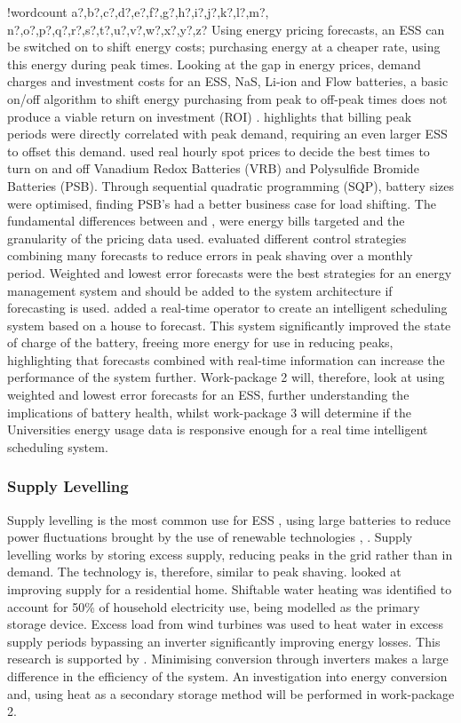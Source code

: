 \documentclass[fontsize=9.5pt]{extarticle}
\numberwithin{figure}{section} %
\newcounter{words}
\newenvironment{counted}{%
  \setcounter{words}{0}
  \SearchList!{wordcount}{\stepcounter{words}}
    {a?,b?,c?,d?,e?,f?,g?,h?,i?,j?,k?,l?,m?,
    n?,o?,p?,q?,r?,s?,t?,u?,v?,w?,x?,y?,z?}
  \UndoBoundary{'}
  \SearchOrder{p;}}{%
  \StopSearching}
\begin{document}
\begin{counted}
Using energy pricing forecasts, an ESS can be switched on to shift
energy costs; purchasing energy at a cheaper rate, using this energy
during peak times. Looking at the gap in energy prices, demand charges
and investment costs for an ESS, NaS, Li-ion and Flow batteries, a basic
on/off algorithm to shift energy purchasing from peak to off-peak times
does not produce a viable return on investment (ROI) \cite{7555795}.
\cite{7555793} highlights that billing peak periods were directly
correlated with peak demand, requiring an even larger ESS to offset this
demand. \cite{5590194} used real hourly spot prices to decide the best
times to turn on and off Vanadium Redox Batteries (VRB) and Polysulfide
Bromide Batteries (PSB). Through sequential quadratic programming (SQP),
battery sizes were optimised, finding PSB's had a better business case
for load shifting. The fundamental differences between \cite{7555795}
and \cite{5590194}, were energy bills targeted and the granularity of
the pricing data used. \cite{6938948} evaluated different control
strategies combining many forecasts to reduce errors in peak shaving
over a monthly period. Weighted and lowest error forecasts were the best
strategies for an energy management system and should be added to the
system architecture if forecasting is used. \cite{Bennett2015122} added
a real-time operator to create an intelligent scheduling system based on
a house to forecast. This system significantly improved the state of
charge of the battery, freeing more energy for use in reducing peaks,
highlighting that forecasts combined with real-time information can
increase the performance of the system further. Work-package 2 will,
therefore, look at using weighted and lowest error forecasts for an ESS,
further understanding the implications of battery health, whilst
work-package 3 will determine if the Universities energy usage data is
responsive enough for a real time intelligent scheduling system.

\subsubsection{Supply Levelling}\label{supply-levelling}

Supply levelling is the most common use for ESS \cite{iearoadmapes},
using large batteries to reduce power fluctuations brought by the use of
renewable technologies \cite{7324861}, \cite{7564619}. Supply levelling
works by storing excess supply, reducing peaks in the grid rather than
in demand. The technology is, therefore, similar to peak shaving.
\cite{Allik20161116} looked at improving supply for a residential home.
Shiftable water heating was identified to account for 50\% of household
electricity use, being modelled as the primary storage device. Excess
load from wind turbines was used to heat water in excess supply periods
bypassing an inverter significantly improving energy losses. This
research is supported by \cite{Leadbetter2012685}. Minimising conversion
through inverters makes a large difference in the efficiency of the
system. An investigation into energy conversion and, using heat as a
secondary storage method will be performed in work-package 2.


\end{counted}
\end{document}
